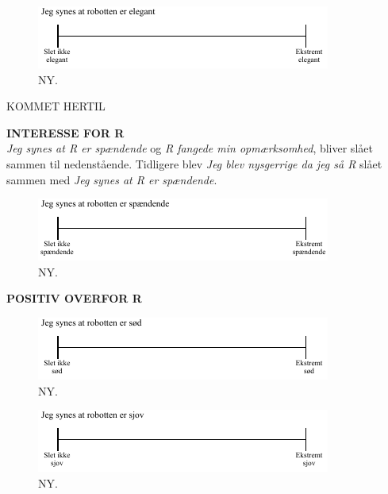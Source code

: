 %
\begin{figure}[H]
\centering
\includegraphics[width =\textwidth]{Figure/UdvalgteSkalaer/ElegantR} 
\caption{NY.}
\label{fig:SkalaElegantR}
\end{figure}
\noindent
%
KOMMET HERTIL

\textbf{INTERESSE FOR R}\\
\textit{Jeg synes at R er spændende} og \textit{R fangede min opmærksomhed}, bliver slået sammen til nedenstående. Tidligere blev \textit{Jeg blev nysgerrige da jeg så R} slået sammen med \textit{Jeg synes at R er spændende}.
%
\begin{figure}[H]
\centering
\includegraphics[width =\textwidth]{Figure/UdvalgteSkalaer/RerSpaendende} 
\caption{NY.}
\label{fig:SkalaRerSpaendende}
\end{figure}
\noindent
%
\textbf{POSITIV OVERFOR R}\\
%
\begin{figure}[H]
\centering
\includegraphics[width =\textwidth]{Figure/UdvalgteSkalaer/SoedR} 
\caption{NY.}
\label{fig:SkalaSoedR}
\end{figure}
\noindent
%
%
\begin{figure}[H]
\centering
\includegraphics[width =\textwidth]{Figure/UdvalgteSkalaer/SjovR} 
\caption{NY.}
\label{fig:SkalaSjovR}
\end{figure}
